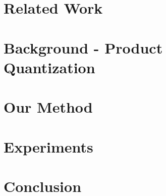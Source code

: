 \documentclass{article}  %
\begin{document}


\section{Related Work} \label{sec:relatedWork}


% 

\vspace{-1.5mm}
\section{Background - Product Quantization} \label{sec:background}
\vspace{-.5mm}



\vspace{-3mm}
\section{Our Method} \label{sec:method}
\vspace{-.5mm}



\section{Experiments} \label{sec:results}



\vspace{-2.5mm}
\section{Conclusion}
\vspace{-.5mm}
\end{document}
